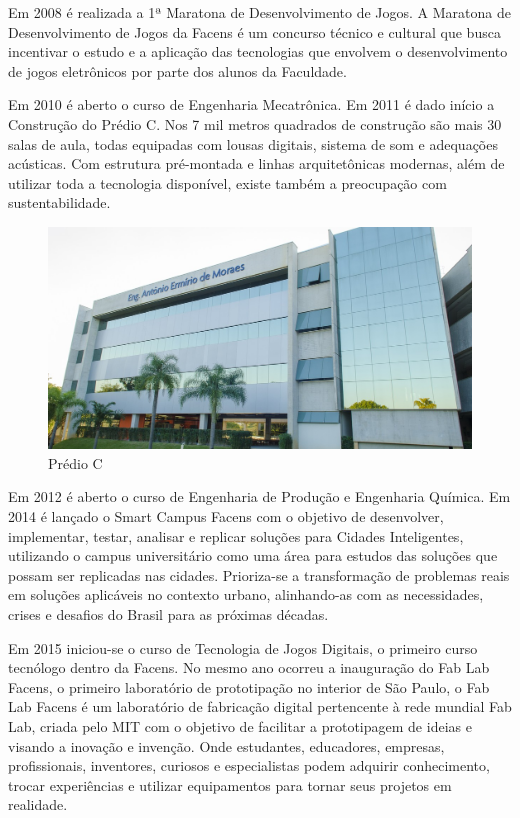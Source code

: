 \documentclass[
	12pt,				%
	oneside,			%
	a4paper,			%
	chapter=TITLE,		%
	section=TITLE,		%
	sumario=tradicional %
	english,			%
	french,				%
	spanish,			%
	brazil				%
	]{abntex2}
\begin{document}
Em 2008 é realizada a 1ª Maratona de Desenvolvimento de Jogos. A Maratona de Desenvolvimento de Jogos da Facens é um concurso técnico e cultural que busca incentivar o estudo e a aplicação das tecnologias que envolvem o desenvolvimento de jogos eletrônicos por parte dos alunos da Faculdade.

Em 2010 é aberto o curso de Engenharia Mecatrônica. Em 2011 é dado início a Construção do Prédio C. Nos 7 mil metros quadrados de construção são mais 30 salas de aula, todas equipadas com lousas digitais, sistema de som e adequações acústicas. Com estrutura pré-montada e linhas arquitetônicas modernas, além de utilizar toda a tecnologia disponível, existe também a preocupação com sustentabilidade.

\begin{figure}[htb]
	\caption{\label{fig:predioc} Prédio C}
	\begin{center}
		\includegraphics[scale=0.3]{predioc}
	\end{center}
\end{figure}

Em 2012 é aberto o curso de Engenharia de Produção e Engenharia Química. Em 2014 é lançado o Smart Campus Facens com o objetivo de  desenvolver, implementar, testar, analisar e replicar soluções para Cidades Inteligentes, utilizando o campus universitário como uma área para estudos das soluções que possam ser replicadas nas cidades. Prioriza-se a transformação de problemas reais em soluções aplicáveis no contexto urbano, alinhando-as com as necessidades, crises e desafios do Brasil para as próximas décadas. 

Em 2015 iniciou-se o curso de Tecnologia de Jogos Digitais, o primeiro curso tecnólogo dentro da Facens. No mesmo ano ocorreu a inauguração do Fab Lab Facens, o primeiro laboratório de prototipação no interior de São Paulo, o Fab Lab Facens é um laboratório de fabricação digital pertencente à rede mundial Fab Lab, criada pelo MIT com o objetivo de facilitar a prototipagem de ideias e visando a inovação e invenção. Onde estudantes, educadores, empresas, profissionais, inventores, curiosos e especialistas podem adquirir conhecimento, trocar experiências e utilizar equipamentos para tornar seus projetos em realidade.
\end{document}
